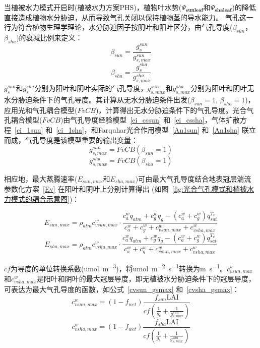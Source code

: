 当植被水力模式开启时(植被水力方案PHS)，植物叶水势($\Psi_{\mathbf{sunleaf}}$和$\Psi_{\mathbf{shaleaf}}$)的降低直接造成植物水分胁迫，从而导致气孔关闭以保持植物茎的导水能力。
气孔这一行为符合植物生理学理论，水分胁迫因子按阴叶和阳叶区分，由气孔导度($\beta_{sun}$，$\beta_{sha}$)的衰减比例来定义：
\begin{equation}\label{beta_sun}
\beta_{sun}=\frac{g_{s}^{sun}}{g_{s,max}^{sun}}
\end{equation}
\begin{equation}\label{beta_sha}
\beta_{sha}=\frac{g_{s}^{sha}}{g_{s,max}^{sha}}
\end{equation}
$g_{s}^{sun}$和$g_{s}^{sha}$分别为阳叶和阴叶实际的气孔导度，$g_{s,max}^{sun}$和$g_{s,max}^{sha}$分别为阳叶和阴叶无水分胁迫条件下的气孔导度。其计算从无水分胁迫条件出发($\beta_{sun}=1$, $\beta_{sha}=1$)，应用光和气孔耦合模型($FvCB$)，计算得出无水分胁迫条件下的气孔导度。光合气孔耦合模型($FvCB$)由气孔导度经验模型~\eqref{ei_cssun} 和~\eqref{ei_cssha}，气体扩散方程~\eqref{ci_1sun} 和~\eqref{ci_1sha}，和Farquhar光合作用模型~\eqref{An1sun} 和~\eqref{An1sha} 联立而成，气孔导度是该模型重要的输出变量：
\begin{equation}\label{gs_sunmax}
g_{s,max}^{sun}=FvCB\left(\beta_{sun}=1\right)
\end{equation}
\begin{equation}\label{gs_shamax}
g_{s,max}^{sha}=FvCB\left(\beta_{sha}=1\right)
\end{equation}


相应地，最大蒸腾速率($E_{sun,max}$和$E_{sha,max}$)可由最大气孔导度结合地表冠层湍流参数化方案~\eqref{Ev} 在阳叶和阴叶上分别计算得出 (如图~\ref{fig:光合气孔模式和植被水力模式的耦合示意图})：

\begin{equation}\label{E_sunmax}
E_{sun,max}=\rho_{atm} c_{vsun,max}^{w} \cdot \frac{c_{a}^{w} q_{atm}+c_{g}^{w} q_{g}-
\left(c_{a}^{w}+c_{g}^{w}\right) q_{s a t}^{T_{v}}}{c_{a}^{w}+c_{g}^{w}+c_{vsun,max}^{w}+c_{vsha,max}^{w}}
\end{equation}
%
\begin{equation}\label{Eshamax}
E_{sha,max}=\rho_{atm} c_{vsha,max}^{w} \cdot \frac{c_{a}^{w} q_{atm}+c_{g}^{w} q_{g}-
\left(c_{a}^{w}+c_{g}^{w}\right) q_{s a t}^{T_{v}}}{c_{a}^{w}+c_{g}^{w}+c_{vsun,max}^{w}+c_{vsha,max}^{w}}
\end{equation}


$cf$为导度的单位转换系数(\unit{umol.m^{-3}})，将\unit{umol.m^{-2}.s^{-1}}转换为\unit{m.s^{-1}}。$c_{vsun,max}^{w}$和$c_{vsha,max}^{w}$是阳叶和阴叶的最大冠层导度，即无植被水分胁迫条件下的冠层导度，可表达为最大气孔导度的函数，如公式~\eqref{cvsun_gsmax} 和~\eqref{cvsha_gsmax}：
\begin{equation}\label{cvsun_gsmax}
    c_{vsun,max}^{w}=\left(1-f_{wet}\right)\frac{f_{sun}\text{LAI}}{cf\left(\frac{1}{g_b}+\frac{1}{g_{s,max}^{sun}}\right)}
\end{equation}
%
\begin{equation}\label{cvsha_gsmax}
    c_{vsha,max}^{w}=\left(1-f_{wet}\right)\frac{f_{sha}\text{LAI}}{cf\left(\frac{1}{g_b}+\frac{1}{g_{s,max}^{sha}}\right)}
\end{equation}

